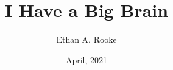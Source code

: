 \documentclass{uithesis}
\title{I Have a Big Brain}
\author{Ethan A. Rooke}
\date{April, 2021}
\begin{document}
\titlepage
\end{document}
